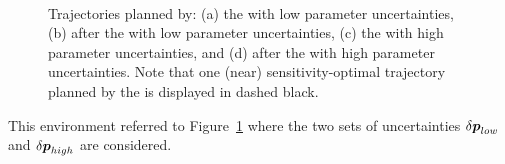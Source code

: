 \begin{figure} [htp]
    \centering
    \\
    \caption{Trajectories planned by: (a) the  with low parameter uncertainties, (b) after the  with low parameter uncertainties, (c) the  with high parameter uncertainties, and (d) after the  with high parameter uncertainties.
    Note that one (near) sensitivity-optimal trajectory planned by the  is displayed in dashed black.}%
    \label{fig:2way}%
\end{figure}

This environment referred to Figure~\ref{fig:2way} where the two sets of uncertainties $\delta\boldsymbol{p}_{low}$ and $\delta\boldsymbol{p}_{high}$ are considered.

